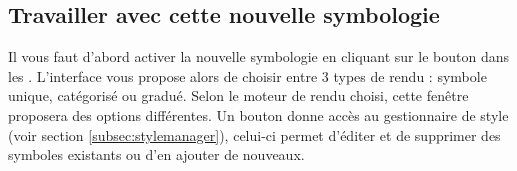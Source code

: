 \subsection{Travailler avec cette nouvelle symbologie}\label{working_with_new_symbology}

Il vous faut d'abord activer la nouvelle symbologie en cliquant sur le bouton  dans les . L'interface vous propose alors de choisir entre 3 types de rendu : symbole unique, catégorisé ou gradué. Selon le moteur de rendu choisi, cette fenêtre proposera des options différentes. Un bouton  donne accès au gestionnaire de style (voir section \ref{subsec:stylemanager}), celui-ci permet d'éditer et de supprimer des symboles existants ou d'en ajouter de nouveaux.


